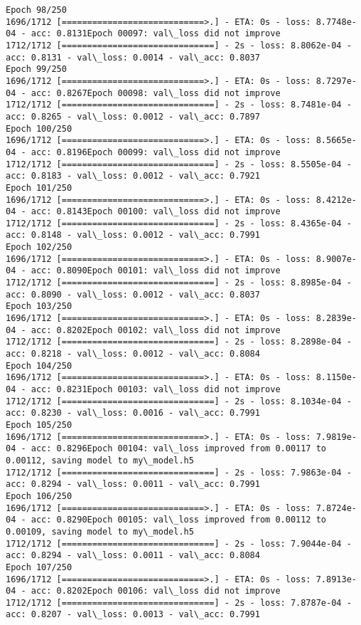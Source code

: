 \documentclass[11pt]{article}
\begin{document}
\begin{Verbatim}[commandchars=\\\{\}]
Epoch 98/250
1696/1712 [============================>.] - ETA: 0s - loss: 8.7748e-04 - acc: 0.8131Epoch 00097: val\_loss did not improve
1712/1712 [==============================] - 2s - loss: 8.8062e-04 - acc: 0.8131 - val\_loss: 0.0014 - val\_acc: 0.8037
Epoch 99/250
1696/1712 [============================>.] - ETA: 0s - loss: 8.7297e-04 - acc: 0.8267Epoch 00098: val\_loss did not improve
1712/1712 [==============================] - 2s - loss: 8.7481e-04 - acc: 0.8265 - val\_loss: 0.0012 - val\_acc: 0.7897
Epoch 100/250
1696/1712 [============================>.] - ETA: 0s - loss: 8.5665e-04 - acc: 0.8196Epoch 00099: val\_loss did not improve
1712/1712 [==============================] - 2s - loss: 8.5505e-04 - acc: 0.8183 - val\_loss: 0.0012 - val\_acc: 0.7921
Epoch 101/250
1696/1712 [============================>.] - ETA: 0s - loss: 8.4212e-04 - acc: 0.8143Epoch 00100: val\_loss did not improve
1712/1712 [==============================] - 2s - loss: 8.4365e-04 - acc: 0.8148 - val\_loss: 0.0012 - val\_acc: 0.7991
Epoch 102/250
1696/1712 [============================>.] - ETA: 0s - loss: 8.9007e-04 - acc: 0.8090Epoch 00101: val\_loss did not improve
1712/1712 [==============================] - 2s - loss: 8.8985e-04 - acc: 0.8090 - val\_loss: 0.0012 - val\_acc: 0.8037
Epoch 103/250
1696/1712 [============================>.] - ETA: 0s - loss: 8.2839e-04 - acc: 0.8202Epoch 00102: val\_loss did not improve
1712/1712 [==============================] - 2s - loss: 8.2898e-04 - acc: 0.8218 - val\_loss: 0.0012 - val\_acc: 0.8084
Epoch 104/250
1696/1712 [============================>.] - ETA: 0s - loss: 8.1150e-04 - acc: 0.8231Epoch 00103: val\_loss did not improve
1712/1712 [==============================] - 2s - loss: 8.1034e-04 - acc: 0.8230 - val\_loss: 0.0016 - val\_acc: 0.7991
Epoch 105/250
1696/1712 [============================>.] - ETA: 0s - loss: 7.9819e-04 - acc: 0.8296Epoch 00104: val\_loss improved from 0.00117 to 0.00112, saving model to my\_model.h5
1712/1712 [==============================] - 2s - loss: 7.9863e-04 - acc: 0.8294 - val\_loss: 0.0011 - val\_acc: 0.7991
Epoch 106/250
1696/1712 [============================>.] - ETA: 0s - loss: 7.8724e-04 - acc: 0.8290Epoch 00105: val\_loss improved from 0.00112 to 0.00109, saving model to my\_model.h5
1712/1712 [==============================] - 2s - loss: 7.9044e-04 - acc: 0.8294 - val\_loss: 0.0011 - val\_acc: 0.8084
Epoch 107/250
1696/1712 [============================>.] - ETA: 0s - loss: 7.8913e-04 - acc: 0.8202Epoch 00106: val\_loss did not improve
1712/1712 [==============================] - 2s - loss: 7.8787e-04 - acc: 0.8207 - val\_loss: 0.0013 - val\_acc: 0.7991

\end{Verbatim}
\end{document}
